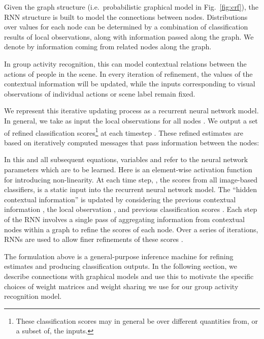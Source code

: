 \documentclass[10pt,twocolumn,letterpaper]{article}
\begin{document}
Given the graph structure (i.e.\ probabilistic graphical model in Fig.~\ref{fig:crf}), the RNN structure is built to model the connections between nodes. Distributions over values for each node  can be determined by a combination of classification results  of local observations, along with information passed along the graph.  We denote by  information coming from related nodes along the graph.

In group activity recognition, this can model contextual relations between the actions of people in the scene. In every iteration of refinement, the values of the contextual information  will be updated, while the inputs corresponding to visual observations of individual actions or scene label remain fixed.
 
We represent this iterative updating process as a recurrent neural network model.  In general, we take as input the local observations for all nodes .  We output a set of refined classification scores\footnote{These classification scores may in general be over different quantities from, or a subset of, the inputs.}  at each timestep .  These refined estimates are based on iteratively computed messages  that pass information between the nodes:

In this and all subsequent equations, variables  and  refer to the neural network parameters which are to be learned. Here  is an element-wise activation function for introducing non-linearity. At each time step, , the scores from all image-based classifiers, is a static input into the recurrent neural network model. The ``hidden contextual information''  is updated by considering the previous contextual information , the local observation , and previous classification scores . Each step of the RNN involves a single pass of aggregating information from contextual nodes within a graph to refine the scores of each node. Over a series of iterations, RNNs are used to allow finer refinements of these scores .  






The formulation above is a general-purpose inference machine for refining estimates and producing classification outputs.  In the following section, we describe connections with graphical models and use this to motivate the specific choices of weight matrices and weight sharing we use for our group activity recognition model.
 
\end{document}
